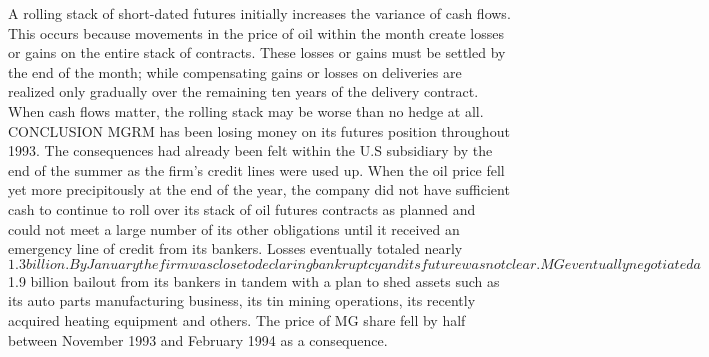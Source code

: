 A rolling stack of short-dated futures initially increases the variance of cash flows.  This occurs because movements in the price of oil within the month create losses or gains on the
entire stack of contracts.  These losses or gains must be settled by the end of the month; while compensating gains or losses on deliveries are realized only gradually over the remaining ten years of the delivery contract.  When cash flows matter, the rolling stack may be worse than no hedge at all.
CONCLUSION
MGRM has been losing money on its futures position throughout 1993.  The consequences had already been felt within the U.S subsidiary by the end of the summer as the
firm’s credit lines were used up.  When the oil price fell yet more precipitously at the end of the year, the company did not have sufficient cash to continue to roll over its stack of oil futures contracts as planned and could not meet a large number of its other obligations until it received an emergency line of credit from its bankers.  Losses eventually totaled nearly $1.3 billion.  By January the firm was close to declaring bankruptcy and its future was not clear. MG eventually negotiated a $1.9 billion bailout from its bankers in tandem with a plan to
shed assets such as its auto parts manufacturing business, its tin mining operations, its recently acquired heating equipment and others.  The price of MG share fell by half between November 1993 and February 1994 as a consequence.
